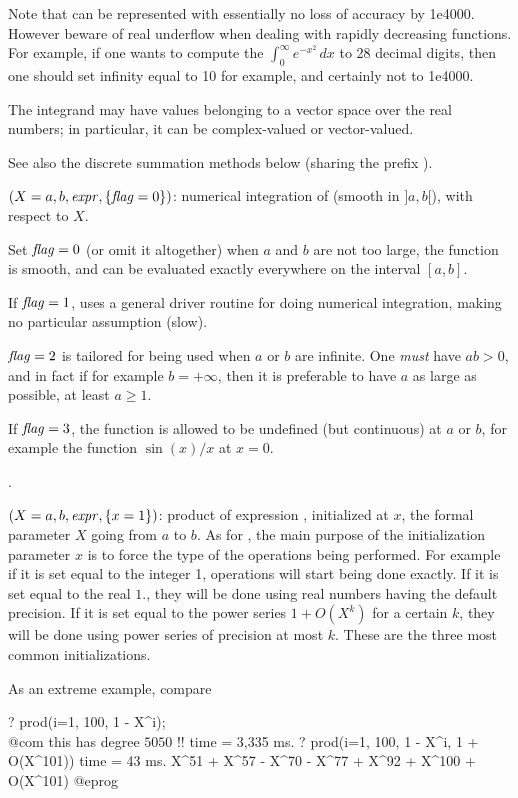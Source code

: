 Note that  can be represented with essentially no loss of
accuracy by 1e4000. However beware of real underflow when dealing with
rapidly decreasing functions. For example, if one wants to compute the
$\int_0^\infty e^{-x^2}\,dx$ to 28 decimal digits, then one should set
infinity equal to 10 for example, and certainly not to 1e4000.

The integrand may have values belonging to a vector space over the real
numbers; in particular, it can be complex-valued or vector-valued.

See also the discrete summation methods below (sharing the prefix ).

$(X=a,b,\hbox{\it expr\/},\{\hbox{\it f\kern0pt lag\/}=0\})$: numerical integration of
 (smooth in $]a,b[$), with respect to $X$.

Set $\hbox{\it f\kern0pt lag\/}=0$ (or omit it altogether) when $a$ and $b$ are not too large, the
function is smooth, and can be evaluated exactly everywhere on the interval
$[a,b]$.

If $\hbox{\it f\kern0pt lag\/}=1$, uses a general driver routine for doing numerical integration,
making no particular assumption (slow).

$\hbox{\it f\kern0pt lag\/}=2$ is tailored for being used when $a$ or $b$ are infinite. One
\emph{must} have $ab>0$, and in fact if for example $b=+\infty$, then it is
preferable to have $a$ as large as possible, at least $a\ge1$.

If $\hbox{\it f\kern0pt lag\/}=3$, the function is allowed to be undefined (but continuous) at $a$
or $b$, for example the function $\sin(x)/x$ at $x=0$.

.

$(X=a,b,\hbox{\it expr\/},\{x=1\})$: product of expression ,
initialized at $x$, the formal parameter $X$ going from $a$ to $b$. As for
, the main purpose of the initialization parameter $x$ is to force
the type of the operations being performed. For example if it is set equal to
the integer 1, operations will start being done exactly. If it is set equal
to the real $1.$, they will be done using real numbers having the default
precision. If it is set equal to the power series $1+O(X^k)$ for a certain
$k$, they will be done using power series of precision at most $k$. These
are the three most common initializations.

\noindent As an extreme example, compare

\bprog
? prod(i=1, 100, 1 - X^i);  \\@com this has degree $5050$ !!
time = 3,335 ms.
? prod(i=1, 100, 1 - X^i, 1 + O(X^101))
time = 43 ms.
  X^51 + X^57 - X^70 - X^77 + X^92 + X^100 + O(X^101)
@eprog

